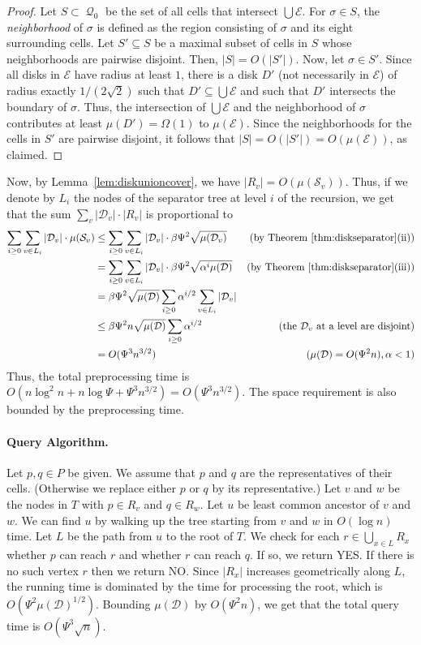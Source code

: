 \documentclass[11pt,a4paper]{paper}
\newcommand\D{{\mathcal D}}
\newcommand\E{{\mathcal E}}
\renewcommand\S{{\mathcal S}}
\DeclareMathOperator{\Q}{\mathcal{Q}}
\begin{document}
\begin{proof}
Let $S \subset \Q_0$ be the set of all cells that intersect
$\bigcup \E$. For $\sigma \in S$, the \emph{neighborhood}
of $\sigma$ is defined as the region consisting of
$\sigma$ and its eight surrounding cells.
Let $S' \subseteq S$ be a maximal subset of cells
in $S$ whose neighborhoods are pairwise disjoint.
Then, $|S| = O(|S'|)$.
Now, let $\sigma \in S'$.
Since all disks in $\E$ have radius at
least $1$, there is a disk $D'$ (not necessarily
in $\E$) of radius
exactly $1/(2\sqrt{2})$ such that $D' \subseteq \bigcup \E$
and such that $D'$ intersects the boundary of $\sigma$.
Thus, the intersection of $\bigcup \E$ and the neighborhood
of $\sigma$ contributes at least $\mu(D') = \Omega(1)$ to $\mu(\E)$.
Since the neighborhoods for the cells in $S'$ are pairwise disjoint,
it follows that $|S| = O(|S'|) = O(\mu(\E))$, as claimed.
\end{proof}

Now, by Lemma~\ref{lem:diskunioncover}, we have $|R_v| = O(\mu(\S_v))$.
Thus, if we denote by $L_i$ the nodes of the separator tree at level
$i$ of the recursion, we get that
the sum $\sum_v |\D_v|\cdot|R_v|$ is proportional to
\begin{align*}
\sum_{i\geq 0} \sum_{v \in L_i} |\D_v| \cdot \mu(\S_v)
&\leq \sum_{i \geq 0} \sum_{v \in L_i} |\D_v| \cdot \beta\Psi^2\sqrt{\mu(\D_v)} & \text{(by Theorem~\ref{thm:diskseparator}(ii))}\\
&= \sum_{i \geq 0} \sum_{v \in L_i} |\D_v| \cdot \beta\Psi^2\sqrt{\alpha^i\mu(\D)}& \text{(by Theorem~\ref{thm:diskseparator}(iii))}\\
&= \beta\Psi^2 \sqrt{\mu(\D)} \sum_{i \geq 0}  \alpha^{i/2} \sum_{v \in L_i} |\D_v| \\
&\leq \beta\Psi^2 n \sqrt{\mu(\D)} \sum_{i \geq 0}  \alpha^{i/2} &
\text{(the $\D_v$ at a level are disjoint)} \\
&=  O(\Psi^3 n^{3/2})  & (\mu(\D) = O(\Psi^2n), \alpha < 1) \\
\end{align*}
Thus, the total preprocessing time is
$O(n\log^2 n + n\log \Psi + \Psi^3 n^{3/2}) =
O(\Psi^3 n^{3/2})$.
The space requirement is also bounded by
the preprocessing time.

\paragraph*{Query Algorithm.}
Let $p,q \in P$ be given. We assume that $p$ and $q$ are the representatives of their cells. (Otherwise
we replace either $p$ or $q$ by its representative.)
Let $v$ and $w$ be the nodes in $T$ with
$p \in R_{v}$ and $q \in R_{w}$.
Let $u$ be least common ancestor of $v$ and $w$. We can find $u$ by
 walking up the tree starting from $v$ and $w$ in $O(\log n)$ time.
Let $L$ be the  path from $u$ to the root
of $T$. We check for each $r \in \bigcup_{x\in L} R_{x}$
whether $p$ can reach $r$ and whether $r$ can reach $q$. If so,
we return YES.
If there is no such vertex
$r$ then we return NO.
Since $|R_x|$ increases geometrically along $L$, the running time
is dominated by the time for processing the root, which is
$O(\Psi^2\mu(\D)^{1/2})$.
Bounding $\mu(\D)$ by $O(\Psi^2n)$,  we get that the total query time is
$O(\Psi^3\sqrt{n})$.
\end{document}
